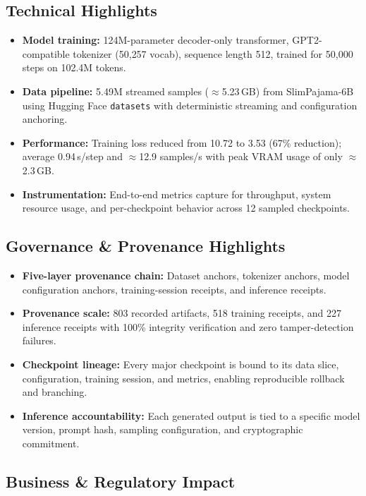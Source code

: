 \documentclass[11pt,a4paper]{article}
\begin{document}
\subsection*{Technical Highlights}

\begin{itemize}
    \item \textbf{Model training:} 124M-parameter decoder-only transformer,
    GPT2-compatible tokenizer (50{,}257 vocab), sequence length 512, trained for
    50{,}000 steps on 102.4M tokens.
    \item \textbf{Data pipeline:} 5.49M streamed samples ($\approx$5.23\,GB) from
    SlimPajama-6B using Hugging Face \texttt{datasets} with deterministic streaming
    and configuration anchoring.
    \item \textbf{Performance:} Training loss reduced from 10.72 to 3.53 (67\%
    reduction); average 0.94\,s/step and $\approx$12.9 samples/s with peak VRAM
    usage of only $\approx$2.3\,GB.
    \item \textbf{Instrumentation:} End-to-end metrics capture for throughput,
    system resource usage, and per-checkpoint behavior across 12 sampled checkpoints.
\end{itemize}

\subsection*{Governance \& Provenance Highlights}

\begin{itemize}
    \item \textbf{Five-layer provenance chain:} Dataset anchors, tokenizer anchors,
    model configuration anchors, training-session receipts, and inference receipts.
    \item \textbf{Provenance scale:} 803 recorded artifacts, 518 training receipts,
    and 227 inference receipts with 100\% integrity verification and zero
    tamper-detection failures.
    \item \textbf{Checkpoint lineage:} Every major checkpoint is bound to its data
    slice, configuration, training session, and metrics, enabling reproducible
    rollback and branching.
    \item \textbf{Inference accountability:} Each generated output is tied to a
    specific model version, prompt hash, sampling configuration, and cryptographic
    commitment.
\end{itemize}

\subsection*{Business \& Regulatory Impact}
\end{document}
